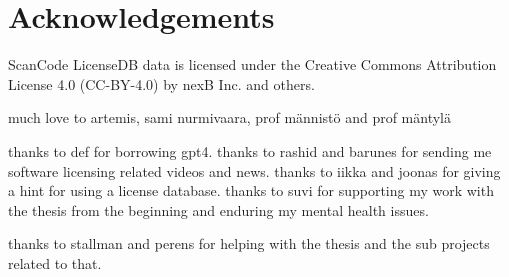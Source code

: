 \section*{Acknowledgements}
ScanCode LicenseDB data is licensed under the Creative Commons Attribution License 4.0 (CC-BY-4.0) by nexB Inc. and others.

much love to artemis, sami nurmivaara, prof männistö and prof mäntylä

thanks to def for borrowing gpt4. thanks to rashid and barunes for sending me software licensing related videos and news. thanks to iikka and joonas for giving a hint for using a license database. thanks to suvi for supporting my work with the thesis from the beginning and enduring my mental health issues.

thanks to stallman and perens for helping with the thesis and the sub projects related to that.